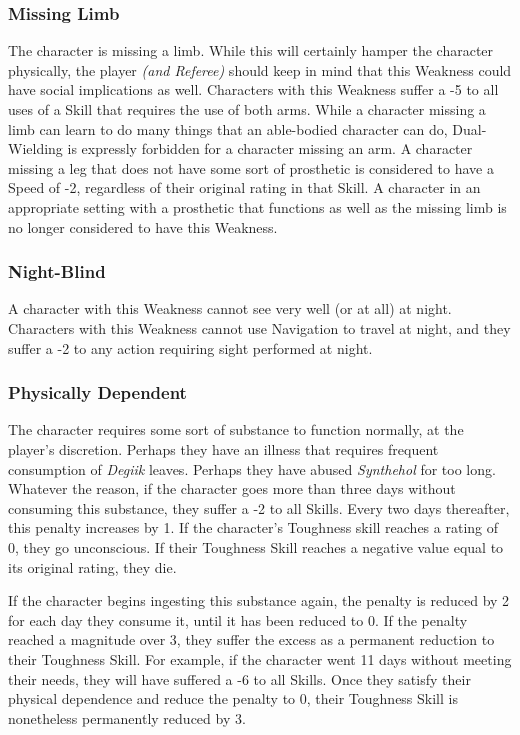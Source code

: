\documentclass[oneside]{book}
\begin{document}
\begin{multicols}{2}
\subsubsection{Missing Limb}
The character is missing a limb. While this will certainly hamper the character physically, the player \emph{(and Referee)} should keep in mind that this Weakness could have social implications as well. Characters with this Weakness suffer a -5 to all uses of a Skill that requires the use of both arms. While a character missing a limb can learn to do many things that an able-bodied character can do, Dual-Wielding is expressly forbidden for a character missing an arm. A character missing a leg that does not have some sort of prosthetic is considered to have a Speed of -2, regardless of their original rating in that Skill. A character in an appropriate setting with a prosthetic that functions as well as the missing limb is no longer considered to have this Weakness.
\subsubsection{Night-Blind}
A character with this Weakness cannot see very well (or at all) at night. Characters with this Weakness cannot use Navigation to travel at night, and they suffer a -2 to any action requiring sight performed at night. 
\subsubsection{Physically Dependent}
The character requires some sort of substance to function normally, at the player's discretion. Perhaps they have an illness that requires frequent consumption of \emph{Degiik} leaves. Perhaps they have abused \emph{Synthehol} for too long. Whatever the reason, if the character goes more than three days without consuming this substance, they suffer a -2 to all Skills. Every two days thereafter, this penalty increases by 1. If the character's Toughness skill reaches a rating of 0, they go unconscious. If their Toughness Skill reaches a negative value equal to its original rating, they die. 

If the character begins ingesting this substance again, the penalty is reduced by 2 for each day they consume it, until it has been reduced to 0. If the penalty reached a magnitude over 3, they suffer the excess as a permanent reduction to their Toughness Skill. For example, if the character went 11 days without meeting their needs, they will have suffered a -6 to all Skills. Once they satisfy their physical dependence and reduce the penalty to 0, their Toughness Skill is nonetheless permanently reduced by 3. 


\end{multicols}
\end{document}
